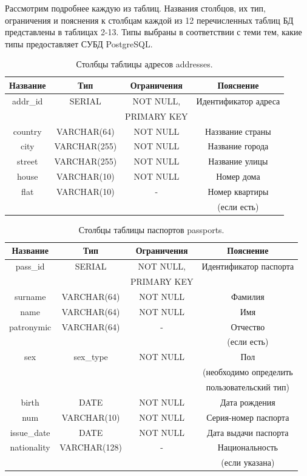 \documentclass[a4paper,14pt]{article}
\begin{document}
Рассмотрим подробнее каждую из таблиц. Названия столбцов, их тип, ограничения и пояснения к столбцам каждой из 12 перечисленных таблиц БД представлены в таблицах 2-13. Типы выбраны в соответствии с теми тем, какие типы предоставляет СУБД PostgreSQL.

\newpage
\begin{table}[!h]
	\caption{Столбцы таблицы адресов addresses.}
	\begin{center}
		\begin{tabular}{| c | c | c | c |}
	 	\hline
		Название & Тип & Ограничения & Пояснение \\ \hline
		addr\_id & SERIAL & NOT NULL, & Идентификатор адреса \\ 
		& & PRIMARY KEY & \\ \hline
		country & VARCHAR(64) & NOT NULL & Наззвание страны \\ \hline
		city & VARCHAR(255) & NOT NULL & Название города \\ \hline
		street & VARCHAR(255) & NOT NULL & Название улицы \\ \hline
		house & VARCHAR(10) & NOT NULL & Номер дома \\ \hline
		flat & VARCHAR(10) & - & Номер квартиры \\ 
		& & & (если есть) \\ \hline
	\end{tabular}
	\end{center}
\end{table}

\begin{table}[!h]
	\caption{Столбцы таблицы паспортов passports.}
	\begin{center}
		\begin{tabular}{| c | c | c | c |}
	 	\hline
		Название & Тип & Ограничения & Пояснение \\ \hline
		pass\_id & SERIAL & NOT NULL, & Идентификатор паспорта \\ 
		& & PRIMARY KEY & \\ \hline
		surname & VARCHAR(64) & NOT NULL & Фамилия \\ \hline
		name & VARCHAR(64) & NOT NULL & Имя \\ \hline
		patronymic & VARCHAR(64) & - & Отчество \\
		 &  &  & (если есть) \\ \hline
		sex & sex\_type & NOT NULL & Пол \\ 
		 &  &  & (необходимо определить \\ 
		 &  &  & пользовательский тип) \\ \hline
		birth & DATE & NOT NULL & Дата рождения \\ \hline
		num & VARCHAR(10) & NOT NULL & Серия-номер паспорта \\ \hline
		issue\_date & DATE & NOT NULL & Дата выдачи паспорта \\ \hline
		nationality & VARCHAR(128) & - & Национальность \\
		 &  &  & (если указана) \\ \hline
	\end{tabular}
	\end{center}
\end{table}
\end{document}
